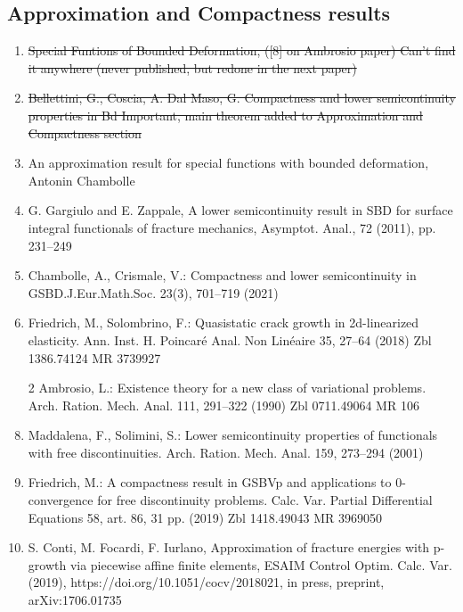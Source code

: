 \subsection{Approximation and Compactness results}
\begin{enumerate}
\item \sout{Special Funtions of Bounded Deformation, ([8] on Ambrosio paper) Can't find it anywhere (never published, but redone in the next  paper)}
\item \sout{Bellettini, G., Coscia, A. Dal Maso, G. Compactness and lower semicontinuity properties in Bd Important, main theorem added to Approximation and Compactness section}
\item An approximation result for special functions with bounded deformation, Antonin Chambolle
\item G. Gargiulo and E. Zappale, A lower semicontinuity result in SBD for surface integral functionals of fracture mechanics, Asymptot. Anal., 72 (2011), pp. 231–249
\item Chambolle, A., Crismale, V.: Compactness and lower semicontinuity in GSBD.J.Eur.Math.Soc. 23(3), 701–719 (2021) 
\item Friedrich, M., Solombrino, F.: Quasistatic crack growth in 2d-linearized elasticity. Ann. Inst.
H. Poincaré Anal. Non Linéaire 35, 27–64 (2018) Zbl 1386.74124 MR 3739927
\item [2] Ambrosio, L.: Existence theory for a new class of variational problems. Arch. Ration. Mech.
Anal. 111, 291–322 (1990) Zbl 0711.49064 MR 106
\item Maddalena, F., Solimini, S.: Lower semicontinuity properties of functionals with free discontinuities. Arch. Ration. Mech. Anal. 159, 273–294 (2001)
\item Friedrich, M.: A compactness result in GSBVp and applications to 0-convergence for free
discontinuity problems. Calc. Var. Partial Differential Equations 58, art. 86, 31 pp. (2019)
Zbl 1418.49043 MR 3969050
\item  S. Conti, M. Focardi, F. Iurlano, Approximation of fracture energies with p-growth via piecewise affine finite elements,
ESAIM Control Optim. Calc. Var. (2019), https://doi.org/10.1051/cocv/2018021, in press, preprint, arXiv:1706.01735
\end{enumerate}

